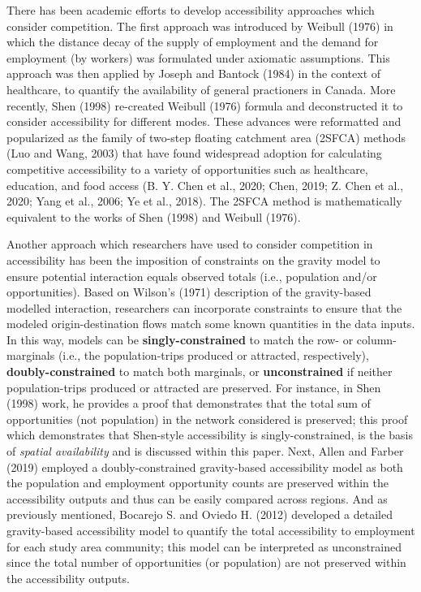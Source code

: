 \documentclass[]{elsarticle} %
\begin{document}
There has been academic efforts to develop accessibility approaches
which consider competition. The first approach was introduced by Weibull
(1976) in which the distance decay of the supply of employment and the
demand for employment (by workers) was formulated under axiomatic
assumptions. This approach was then applied by Joseph and Bantock (1984)
in the context of healthcare, to quantify the availability of general
practioners in Canada. More recently, Shen (1998) re-created Weibull
(1976) formula and deconstructed it to consider accessibility for
different modes. These advances were reformatted and popularized as the
family of two-step floating catchment area (2SFCA) methods (Luo and
Wang, 2003) that have found widespread adoption for calculating
competitive accessibility to a variety of opportunities such as
healthcare, education, and food access (B. Y. Chen et al., 2020; Chen,
2019; Z. Chen et al., 2020; Yang et al., 2006; Ye et al., 2018). The
2SFCA method is mathematically equivalent to the works of Shen (1998)
and Weibull (1976).

Another approach which researchers have used to consider competition in
accessibility has been the imposition of constraints on the gravity
model to ensure potential interaction equals observed totals (i.e.,
population and/or opportunities). Based on Wilson's (1971) description
of the gravity-based modelled interaction, researchers can incorporate
constraints to ensure that the modeled origin-destination flows match
some known quantities in the data inputs. In this way, models can be
\textbf{singly-constrained} to match the row- or column-marginals (i.e.,
the population-trips produced or attracted, respectively),
\textbf{doubly-constrained} to match both marginals, or
\textbf{unconstrained} if neither population-trips produced or attracted
are preserved. For instance, in Shen (1998) work, he provides a proof
that demonstrates that the total sum of opportunities (not population)
in the network considered is preserved; this proof which demonstrates
that Shen-style accessibility is singly-constrained, is the basis of
\emph{spatial availability} and is discussed within this paper. Next,
Allen and Farber (2019) employed a doubly-constrained gravity-based
accessibility model as both the population and employment opportunity
counts are preserved within the accessibility outputs and thus can be
easily compared across regions. And as previously mentioned, Bocarejo S.
and Oviedo H. (2012) developed a detailed gravity-based accessibility
model to quantify the total accessibility to employment for each study
area community; this model can be interpreted as unconstrained since the
total number of opportunities (or population) are not preserved within
the accessibility outputs.
\end{document}
